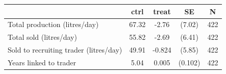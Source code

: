 \begin{tabular}{lcccc}
\hline\hline
 & ctrl & treat & SE & N \\
\hline
Total production (litres/day) & 67.32 & -2.76 & (7.02) & 422 \\
Total sold (litres/day) & 55.82 & -2.69 & (6.41) & 422 \\
Sold to recruiting trader (litres/day) & 49.91 & -0.824 & (5.85) & 422 \\
Years linked to trader & 5.04 & 0.005 & (0.102) & 422 \\
\hline\hline
\end{tabular}
